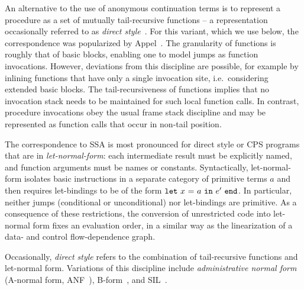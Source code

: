 An alternative to the use of anonymous continuation terms is to
represent a procedure as a set of mutually tail-recursive functions --
a representation occasionally referred to as \emph{direct
style}~\cite{Reynolds1974}. For this variant, which we use below, the
correspondence was popularized by Appel~\cite{Appel98:SSA}. The
granularity of functions is roughly that of basic blocks, enabling one
to model jumps as function invocations. However, deviations from this
discipline are possible, for example by inlining functions that have
only a single invocation site, i.e.~considering extended basic blocks.
The tail-recursiveness of functions implies that no invocation stack
needs to be maintained for such local function calls. In contrast,
procedure invocations obey the usual frame stack discipline and may be
represented as function calls that occur in non-tail position.

The correspondence to SSA is most pronounced for direct style or CPS
programs that are in \emph{let-normal-form}: each intermediate result
must be explicitly named, and function arguments must be names or
constants. Syntactically, let-normal-form isolates basic instructions
in a separate category of primitive terms $a$ and then requires
let-bindings to be of the form $\mathtt{let}\ {x}\ \mathtt{=}\ {a}\ \mathtt{in}\ {e'}\ \mathtt{end}$.  In particular,
neither jumps (conditional or unconditional) nor let-bindings are
primitive. As a consequence of these restrictions, the conversion of
unrestricted code into let-normal form fixes an evaluation order, in a
similar way as the linearization of a data- and control
flow-dependence graph.


Occasionally, \emph{direct style} refers to the combination of
tail-recursive functions and let-normal form. Variations of this
discipline include
\emph{administrative normal form} (A-normal form, ANF~\cite{DBLP:conf/pldi/FlanaganSDF93}), B-form~\cite{DBLP:conf/pldi/TarditiMCSHL96}, and SIL~\cite{DBLP:journals/jfp/TolmachO98}. 


